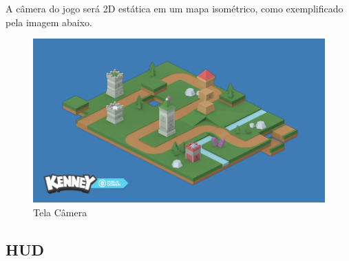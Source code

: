 \documentclass[11pt]{article} %
\begin{document}
A câmera do jogo será 2D estática em um mapa isométrico, como exemplificado pela imagem abaixo.
\begin{figure}[!htp]
\centering
\includegraphics[scale=0.25]{res/map_example.png}
\caption{Tela Câmera}
\label{Tela Barracks}
\end{figure}

\subsection{HUD}
\end{document}
